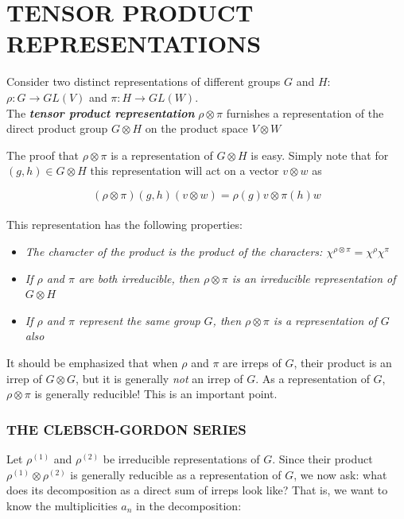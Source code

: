 \documentclass[9 pt]{report}
\begin{document}
\pagebreak

{\centering
\section*{TENSOR PRODUCT REPRESENTATIONS}}
\begin{tcolorbox}
	Consider two distinct representations of different groups $G$ and $H$: $\rho:G\to GL(V)$ and $\pi:H\to GL(W)$.
	\\
	The \textbf{\emph{tensor product representation}} $\rho\otimes\pi$ furnishes a representation of the direct product group $G\otimes H$ on the product space $V\otimes W$
\end{tcolorbox}
The proof that $\rho\otimes \pi$ is a representation of $G\otimes H$ is easy. Simply note that for $(g, h)\in G\otimes H$ this representation will act on a vector $v\otimes w$ as

$$ (\rho\otimes\pi)(g, h)(v\otimes w) = \rho(g)v \otimes \pi(h)w  $$
\\
This representation has the following properties:
\\
\begin{itemize}
	\item \emph{The character of the product is the product of the characters: $\chi^{\rho\otimes\pi} = \chi^{\rho}\chi^{\pi}$}
	\item \emph{If $\rho$ and $\pi$ are both irreducible, then $\rho\otimes\pi$ is an irreducible representation of $G\otimes H$}
	
	\item \emph{If $\rho$ and $\pi$ represent the same group $G$, then $\rho\otimes \pi$ is a representation of $G$ also}
	
\end{itemize}
It should be emphasized that when $\rho$ and $\pi$ are irreps of $G$, their product is an irrep of $G\otimes G$, but it is generally \emph{not} an irrep of $G$. As a representation of $G$, $\rho\otimes\pi $ is generally reducible! This is an important point. 
\\
\subsubsection*{THE CLEBSCH-GORDON SERIES}

Let $\rho^{(1)}$ and $\rho^{(2)}$ be irreducible representations of $G$. Since their product $\rho^{(1)}\otimes\rho^{(2)}$ is generally reducible as a representation of $G$, we now ask: what does its decomposition as a direct sum of irreps look like? That is, we want to know the multiplicities $a_n$ in the decomposition:
\end{document}
